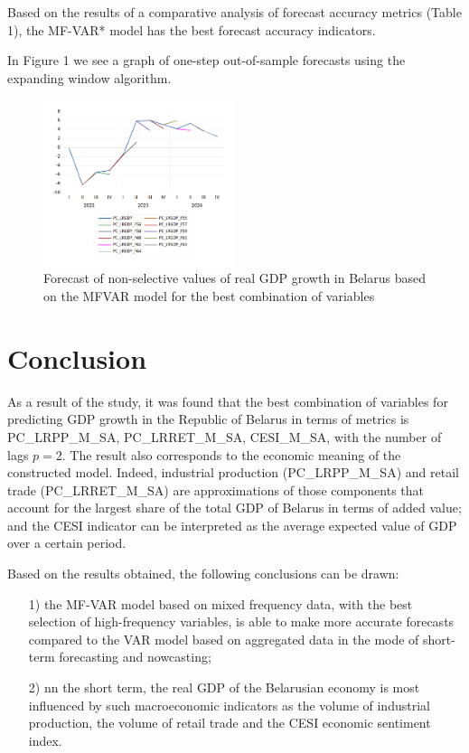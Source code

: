 \documentclass[12pt]{article}
\begin{document}
Based on the results of a comparative analysis of forecast accuracy metrics (Table 1), the MF-VAR* model has the best forecast accuracy indicators. 

In Figure 1 we see a graph of one-step out-of-sample forecasts using the expanding window algorithm.

\begin{figure}[htbp]
	\centering
	\includegraphics[width=0.5\textwidth]{graph01}
	\caption{Forecast of non-selective values of real GDP growth in Belarus based on the MFVAR model for the best combination of variables}
	\label{fig:graph01}
\end{figure}

\section{Conclusion}

As a result of the study, it was found that the best combination of variables for predicting GDP growth in the Republic of Belarus in terms of metrics is PC\_LRPP\_M\_SA, PC\_LRRET\_M\_SA, CESI\_M\_SA, with the number of lags $p=2$. The result also corresponds to the economic meaning of the constructed model. Indeed, industrial production (PC\_LRPP\_M\_SA) and retail trade (PC\_LRRET\_M\_SA) are approximations of those components that account for the largest share of the total GDP of Belarus in terms of added value; and the CESI indicator can be interpreted as the average expected value of GDP over a certain period.

Based on the results obtained, the following conclusions can be drawn:
\begin{enumerate}
	\item [1)] the MF-VAR model based on mixed frequency data, with the best selection of high-frequency variables, is able to make more accurate forecasts compared to the VAR model based on aggregated data in the mode of short-term forecasting and nowcasting; 
	\item [2)] nn the short term, the real GDP of the Belarusian economy is most influenced by such macroeconomic indicators as the volume of industrial production, the volume of retail trade and the CESI economic sentiment index.
\end{enumerate}
\end{document}
